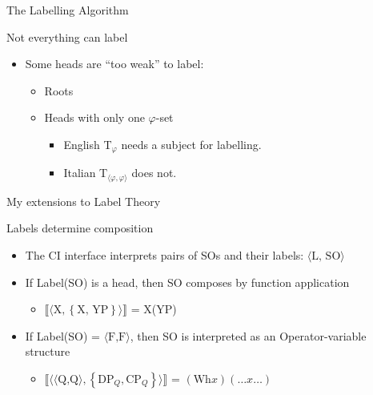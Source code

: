 \documentclass[Proposal]{subfiles}
\begin{document}
\begin{frame}
  {The Labelling Algorithm}

  \begin{block}
    {Not everything can label}
    \begin{itemize}[<+->]
      \item Some heads are ``too weak'' to label:
	\begin{itemize}
	  \item Roots
	  \item Heads with only one $\varphi$-set
	    \begin{itemize}
	      \item English T$_\varphi$ needs a subject for labelling.
	      \item Italian T$_{\langle \varphi,\varphi\rangle}$ does not.
	    \end{itemize}
	\end{itemize}
    \end{itemize}
  \end{block}
\end{frame}
\begin{frame}
  {My extensions to Label Theory}
  \begin{block}
    {Labels determine composition}
    \begin{itemize}
      \item The CI interface interprets pairs of SOs and their labels: $\langle \text{L, SO} \rangle$
      \item<2-> If Label(SO) is a head, then SO composes by function application
	\begin{itemize}
	  \item<3-> $\llbracket\langle \text{X}, \left\{ \text{X, YP} \right\}\rangle\rrbracket$ = X(YP)
	\end{itemize}
      \item<4-> If Label(SO) = $\langle\text{F,F}\rangle$, then SO is interpreted as an Operator-variable structure
	\begin{itemize}
	  \item<5-> $\llbracket\langle \langle\text{Q,Q} \rangle, \left\{ \text{DP}_Q, \text{CP}_Q \right\}\rangle\rrbracket$ = $(\text{Wh}x)(\dots x \dots)$
	\end{itemize}
    \end{itemize}
  \end{block}
\end{frame}
\end{document}
